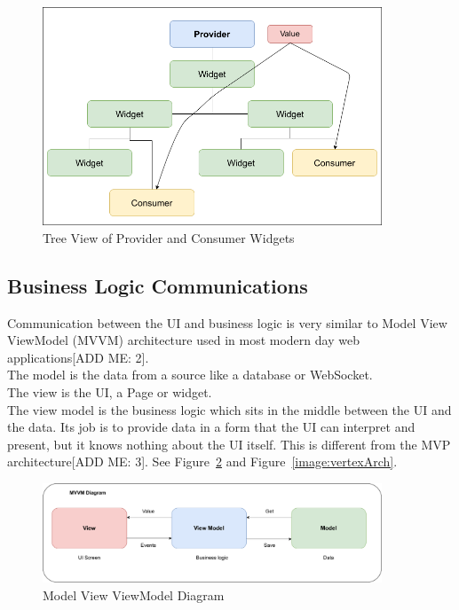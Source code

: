 \begin{figure}[h!]
    \caption{Tree View of Provider and Consumer Widgets}
    \label{image:providerTree}
    \centering
    \includegraphics[width=0.9\textwidth]{images/consumer_tree_with_value.png}
\end{figure}

\subsection{Business Logic Communications}
Communication between the UI and business logic is very similar to Model View ViewModel (MVVM) architecture used in most modern day web applications[ADD ME: 2].
\\ The model is the data from a source like a database or WebSocket.
\\ The view is the UI, a Page or widget.
\\ The view model is the business logic which sits in the middle between the UI and the data. Its job is to provide data in a form that the UI can interpret and present, but it knows nothing about the UI itself. This is different from the MVP architecture[ADD ME: 3].
See Figure~\ref{image:mvvmDiagram} and Figure~\ref{image:vertexArch}.

\begin{figure}[h!]
    \caption{Model View ViewModel Diagram}
    \label{image:mvvmDiagram}
    \centering
    \includegraphics[width=0.9\textwidth]{images/mvvm_diagram.png}
\end{figure}

